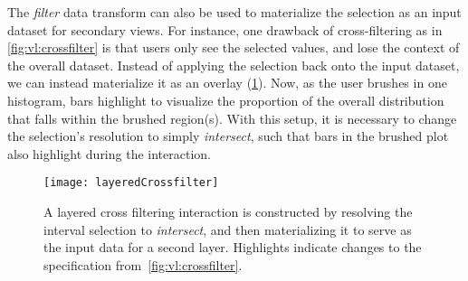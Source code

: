 The \emph{filter} data transform can also be used to materialize the selection
as an input dataset for secondary views. For instance, one drawback of
cross-filtering as in \cref{fig:vl:crossfilter} is that users only see the
selected values, and lose the context of the overall dataset. Instead of
applying the selection back onto the input dataset, we can instead materialize
it as an overlay (\cref{fig:vl:layeredCrossfilter}). Now, as the user brushes in
one histogram, bars highlight to visualize the proportion of the overall
distribution that falls within the brushed region(s). With this setup, it is
necessary to change the selection's resolution to simply \emph{intersect}, such
that bars in the brushed plot also highlight during the interaction.

\begin{figure}[h!]
  \centering
  \texttt{[image: layeredCrossfilter]}
  \caption{A layered cross filtering interaction is constructed by resolving
  the interval selection to \emph{intersect}, and then materializing it to
  serve as the input data for a second layer. Highlights indicate changes to
  the specification from~\cref{fig:vl:crossfilter}.}
  \label{fig:vl:layeredCrossfilter}
\end{figure}